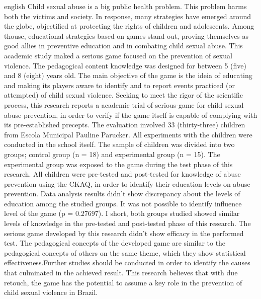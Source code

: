 
\begin{resumo}[Abstract]
 \begin{otherlanguage*}{english}
    Child sexual abuse is a big public health problem. This problem harms both the victims and society. In response, many strategies have emerged around the globe, objectified at protecting the rights of children and adolescents. Among thouse,  educational strategies based on games stand out, proving themselves as good allies in preventive education and in combating child sexual abuse.
    This academic study maked a serious game focused on the prevention of sexual violence. The pedagogical content knowledge was designed for between 5 (five) and 8 (eight) years old. The main objective of the game is the ideia of educating and making its players aware to identify and to report events practiced (or attempted) of child sexual violence. Seeking to meet the rigor of the scientific process, this research reports a academic trial of serious-game for child sexual abuse prevention, in order to verify if the game itself is capable of complying with its pre-established precepts.
    The evaluation involved 33 (thirty-three) children from Escola Municipal Pauline Parucker. All experiments with the children were conducted in the school itself.%
    The sample of children was divided into two groups; control group (n = 18) and experimental group (n = 15). The experimental group was exposed to the game during the test phase of this research. All children were pre-tested and post-tested for knowledge of abuse prevention using the \acf{CKAQ}, in order to identify their education levels on abuse prevention.
    Data analysis results didn't show discrepancy about the levels of education among the studied groups.  It was not possible to identify influence level of the game (p = 0.27697). I short, both groups studied showed similar levels of knowledge in the pre-tested and post-tested phase of this research. 
    The serious game developed by this research didn't show efficacy in the performed test. The pedagogical concepts of the developed game are similar to the pedagogical concepts of others on the same theme, which they show statistical effectiveness.Further studies should be conducted in order to identify the causes that culminated in the achieved result. This research believes that with due retouch, the game has the potential to assume a key role in the prevention of child sexual violence in Brazil.
    


\end{otherlanguage*}
\end{resumo}
